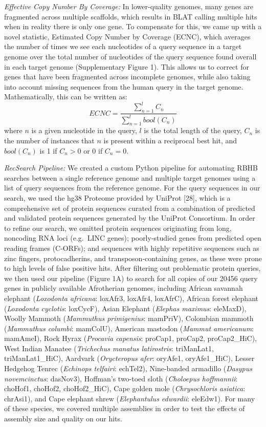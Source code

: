\documentclass[10pt,letterpaper]{article}
\begin{document}
\emph{Effective Copy Number By Coverage:} In lower-quality genomes, many
genes are fragmented across multiple scaffolds, which results in BLAT
calling multiple hits when in reality there is only one gene. To
compensate for this, we came up with a novel statistic, Estimated Copy
Number by Coverage (ECNC), which averages the number of times we see
each nucleotides of a query sequence in a target genome over the total
number of nucleotides of the query sequence found overall in each target
genome (Supplementary Figure 1). This allows us to correct for genes
that have been fragmented across incomplete genomes, while also taking
into account missing sequences from the human query in the target
genome. Mathematically, this can be written as:\\
\[ ECNC = \frac{\sum_{n=1}^{l} C_n}{\sum_{n=1}^{l} bool(C_n)}\] where
\(n\) is a given nucleotide in the query, \(l\) is the total length of
the query, \(C_n\) is the number of instances that \(n\) is present
within a reciprocal best hit, and \(bool(C_n)\) is 1 if \(C_n > 0\) or 0
if \(C_n = 0\).

\emph{RecSearch Pipeline:} We created a custom Python pipeline for
automating RBHB searches between a single reference genome and multiple
target genomes using a list of query sequences from the reference
genome. For the query sequences in our search, we used the hg38 Proteome
provided by UniProt {[}28{]}, which is a comprehensive set of protein
sequences curated from a combination of predicted and validated protein
sequences generated by the UniProt Consortium. In order to refine our
search, we omitted protein sequences originating from long, noncoding
RNA loci (e.g.~LINC genes); poorly-studied genes from predicted open
reading frames (C-ORFs); and sequences with highly repetitive sequences
such as zinc fingers, protocadherins, and transposon-containing genes,
as these were prone to high levels of false positive hits. After
filtering out problematic protein queries, we then used our pipeline
(Figure 1A) to search for all copies of our 20456 query genes in
publicly available Afrotherian genomes, including African savannah
elephant (\emph{Loxodonta africana}: loxAfr3, loxAfr4, loxAfrC), African
forest elephant (\emph{Loxodonta cyclotis}: loxCycF), Asian Elephant
(\emph{Elephas maximus}: eleMaxD), Woolly Mammoth (\emph{Mammuthus
primigenius}: mamPriV), Colombian mammoth (\emph{Mammuthus columbi}:
mamColU), American mastodon (\emph{Mammut americanum}: mamAmeI), Rock
Hyrax (\emph{Procavia capensis}: proCap1, proCap2, proCap2\_HiC), West
Indian Manatee (\emph{Trichechus manatus latirostris}: triManLat1,
triManLat1\_HiC), Aardvark (\emph{Orycteropus afer}: oryAfe1,
oryAfe1\_HiC), Lesser Hedgehog Tenrec (\emph{Echinops telfairi}:
echTel2), Nine-banded armadillo (\emph{Dasypus novemcinctus}: dasNov3),
Hoffman's two-toed sloth (\emph{Choloepus hoffmannii}: choHof1, choHof2,
choHof2\_HiC), Cape golden mole (\emph{Chrysochloris asiatica}:
chrAsi1), and Cape elephant shrew (\emph{Elephantulus edwardii}:
eleEdw1). For many of these species, we covered multiple assemblies in
order to test the effects of assembly size and quality on our hits.
\end{document}
